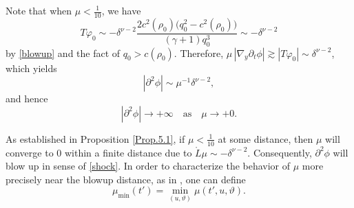\documentclass[11pt,twoside]{article}
\def\vp{\varphi}
\def\f{\frac}
\begin{document}
Note that when $\mu<\f{1}{10}$, we have
\[
T\vp_0 \sim -\delta^{\nu-2} \frac{2c^2(\rho_0) \big(q_{0}^{2}-c^{2}(\rho_{0}) \big)}{(\gamma+ 1)q_0^3} \sim -\delta^{\nu-2}
\]
by \eqref{blowup} and the fact of $q_0 > c(\rho_0)$. Therefore,
$\mu \, |\nabla_y \partial_t \phi| \gtrsim |T\vp_0| \sim \delta^{\nu-2}$,
which yields
\begin{equation}\label{shock-0}
|\partial^2\phi| \sim \mu^{-1}\delta^{\nu-2},
\end{equation}
and hence
\begin{equation}\label{shock}
|\partial^2\phi| \rightarrow +\infty \quad \text{as} \quad \mu \rightarrow +0.
\end{equation}

As established in Proposition \ref{Prop.5.1}, if $\mu< \frac{1}{10}$ at some distance, then $\mu$ will converge to $0$
within a finite distance due to $\mathring{L}\mu \sim -\delta^{\nu-2}$. Consequently, $\partial^2\phi$ will blow up in sense of \eqref{shock}.
In order to characterize the behavior of $\mu$ more precisely near the blowup distance, as in \cite{Sp, M-Y}, one can define
$$\mu_{\min}(t') = \min_{(u,\vartheta)} \mu(t',u,\vartheta).$$
\end{document}
